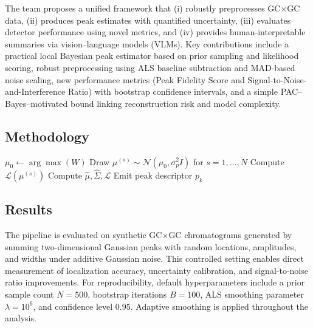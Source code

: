 The team proposes a unified framework that (i) robustly preprocesses GC$\times$GC data, (ii) produces peak estimates with quantified uncertainty, (iii) evaluates detector performance using novel metrics, and (iv) provides human-interpretable summaries via vision--language models (VLMs). Key contributions include a practical local Bayesian peak estimator based on prior sampling and likelihood scoring, robust preprocessing using ALS baseline subtraction and MAD-based noise scaling, new performance metrics (Peak Fidelity Score and Signal-to-Noise-and-Interference Ratio) with bootstrap confidence intervals, and a simple PAC--Bayes–motivated bound linking reconstruction risk and model complexity.


\subsection*{Methodology}

\begin{algorithm}
\caption{Local posterior approximation (per window)}
\begin{algorithmic}[1]
    \State \(\mu_0 \gets \arg\max(W)\)
    \State Draw \(\mu^{(s)} \sim \mathcal{N}(\mu_0,\sigma_p^2 I)\) for \(s=1,\dots,N\)
    \State Compute \(\mathcal{L}(\mu^{(s)})\)
    \State Compute \(\widehat{\mu}, \widehat{\Sigma}, \overline{\mathcal{L}}\)
      \State Emit peak descriptor \(p_k\)
    \EndIf
  \EndIf
\EndFor
\end{algorithmic}
\end{algorithm}


\subsection*{Results}
The pipeline is evaluated on synthetic GC$\times$GC chromatograms generated by summing two-dimensional Gaussian peaks with random locations, amplitudes, and widths under additive Gaussian noise. This controlled setting enables direct measurement of localization accuracy, uncertainty calibration, and signal-to-noise ratio improvements. For reproducibility, default hyperparameters include a prior sample count \(N=500\), bootstrap iterations \(B=100\), ALS smoothing parameter \(\lambda=10^6\), and confidence level \(0.95\). Adaptive smoothing is applied throughout the analysis.

